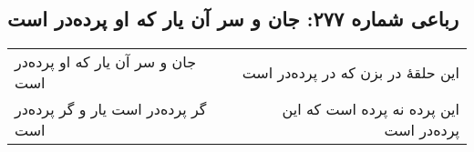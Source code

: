\begin{center}
\section*{رباعی شماره ۲۷۷: جان و سر آن یار که او پرده‌در است}
\label{sec:0277}
\begin{longtable}{l p{0.5cm} r}
جان و سر آن یار که او پرده‌در است
&&
این حلقهٔ در بزن که در پرده‌در است
\\
گر پرده‌در است یار و گر پرده‌در است
&&
این پرده نه پرده است که این پرده‌در است
\\
\end{longtable}
\end{center}
